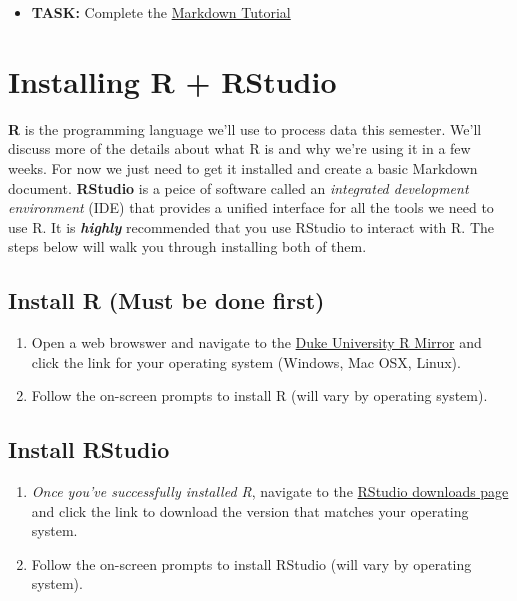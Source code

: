 \documentclass[]{tufte-book}
\providecommand{\tightlist}{%
  \setlength{\itemsep}{0pt}\setlength{\parskip}{0pt}}
\begin{document}
\begin{itemize}
\tightlist
\item
  \textbf{TASK:} Complete the \href{https://www.markdowntutorial.com/}{Markdown Tutorial}
\end{itemize}

\hypertarget{install-r}{%
\section*{Installing R + RStudio}\label{install-r}}

\textbf{R} is the programming language we'll use to process data this semester. We'll discuss more of the details about what R is and why we're using it in a few weeks. For now we just need to get it installed and create a basic Markdown document. \textbf{RStudio} is a peice of software called an \emph{integrated development environment} (IDE) that provides a unified interface for all the tools we need to use R. It is \textbf{\emph{highly}} recommended that you use RStudio to interact with R. The steps below will walk you through installing both of them.

\hypertarget{install-r-must-be-done-first}{%
\subsection*{Install R (Must be done first)}\label{install-r-must-be-done-first}}

\begin{enumerate}
\def\labelenumi{\arabic{enumi}.}
\tightlist
\item
  Open a web browswer and navigate to the \href{http://archive.linux.duke.edu/cran/}{Duke University R Mirror} and click the link for your operating system (Windows, Mac OSX, Linux).\\
\item
  Follow the on-screen prompts to install R (will vary by operating system).
\end{enumerate}

\hypertarget{install-rstudio}{%
\subsection*{Install RStudio}\label{install-rstudio}}

\begin{enumerate}
\def\labelenumi{\arabic{enumi}.}
\tightlist
\item
  \emph{Once you've successfully installed R}, navigate to the \href{https://rstudio.com/products/rstudio/download/\#download}{RStudio downloads page} and click the link to download the version that matches your operating system.\\
\item
  Follow the on-screen prompts to install RStudio (will vary by operating system).
\end{enumerate}
\end{document}
